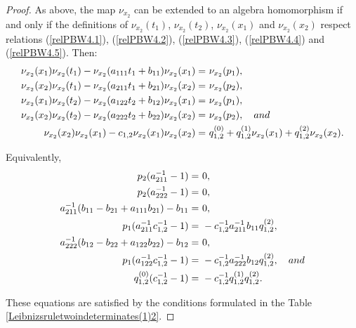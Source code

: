 \documentclass{amsart}
\theoremstyle{definition}
\theoremstyle{remark}
\numberwithin{equation}{section}
\begin{document}
\begin{proof}
As above, the map $\nu_{x_2}$ can be extended to an algebra homomorphism if and only if the definitions of $\nu_{x_2}(t_1)$, $\nu_{x_2}(t_2)$,  $\nu_{x_2}(x_1)$ and $\nu_{x_2}(x_2)$ respect relations {\rm (}\ref{relPBW4.1}{\rm )}, {\rm (}\ref{relPBW4.2}{\rm )}, {\rm (}\ref{relPBW4.3}{\rm )}, {\rm (}\ref{relPBW4.4}{\rm )} and {\rm (}\ref{relPBW4.5}{\rm )}. Then:
\begin{align*}
   \nu_{x_2}(x_1)\nu_{x_2}(t_1)-\nu_{x_2}(a_{111}t_1+b_{11})\nu_{x_2}(x_1) = &\ \nu_{x_2}(p_1), \\
   \nu_{x_2}(x_2)\nu_{x_2}(t_1)-\nu_{x_2}(a_{211}t_1+b_{21})\nu_{x_2}(x_2) = &\ \nu_{x_2}(p_2), \\
   \nu_{x_2}(x_1)\nu_{x_2}(t_2)-\nu_{x_2}(a_{122}t_2+b_{12})\nu_{x_2}(x_1) = &\ \nu_{x_2}(p_1), \\
    \nu_{x_2}(x_2)\nu_{x_2}(t_2)-\nu_{x_2}(a_{222}t_2+b_{22})\nu_{x_2}(x_2) = &\ \nu_{x_2}(p_2), \quad {\rm and} \\
    \nu_{x_2}(x_2)\nu_{x_2}(x_1)-c_{1,2}\nu_{x_2}(x_1)\nu_{x_2}(x_2) = &\ q_{1,2}^{(0)}+q_{1,2}^{(1)}\nu_{x_2}(x_1)+q_{1,2}^{(2)}\nu_{x_2}(x_2).
\end{align*}

Equivalently, 
\begin{align}
p_2(a_{211}^{-1}-1) = &\ 0, \notag \\
p_2(a_{222}^{-1}-1) = &\ 0, \notag \\
a_{211}^{-1}(b_{11}-b_{21}+a_{111}b_
{21})-b_{11} = &\ 0, \label{fourthsecondrel2} \\
p_1(a_{211}^{-1}c_{1,2}^{-1}-1) = &\ -c_{1,2}^{-1}a_{211}^{-1}b_{11}q_{1,2}^{(2)}, \notag \\
a_{222}^{-1}(b_{12}-b_{22}+a_{122}b_
{22})-b_{12} = &\ 0, \notag \\
p_1(a_{122}^{-1}c_{1,2}^{-1}-1) = &\ -c_{1,2}^{-1}a_{222}^{-1}b_{12}q_{1,2}^{(2)}, \quad {\rm and} \notag \\ 
q_{1,2}^{(0)}(c_{1,2}^{-1}-1) = &\ -c_{1,2}^{-1}q_{1,2}^{(1)}q_{1,2}^{(2)}. \notag 
\end{align}

These equations are satisfied by the conditions formulated in the Table \ref{Leibnizsruletwoindeterminates(1)2}.


\end{proof}
\end{document}
